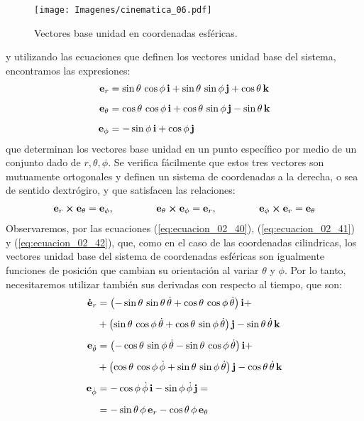 \documentclass[12pt]{article}
\begin{document}
\begin{figure}[H]
    \centering
    \texttt{[image: Imagenes/cinematica\_06.pdf]}
    \caption{Vectores base unidad en coordenadas esféricas.}
    \label{fig:figura_02_06}
\end{figure}
y utilizando las ecuaciones que definen los vectores unidad base del sistema, encontramos las expresiones:
\begin{align}
    \vb{e}_{r} &= \sin \theta \, \cos \phi \, \vb{i} + \sin \theta \, \sin \phi \, \vb{j} + \cos \theta \, \vb{k} \label{eq:ecuacion_02_40} \\[0.5em]
    \vb{e}_{\theta} &= \cos \theta \, \cos \phi \, \vb{i} + \cos \theta \, \sin \phi \, \vb{j} - \sin \theta \, \vb{k} \label{eq:ecuacion_02_41} \\[0.5em]
    \vb{e}_{\phi} &= - \sin \phi \, \vb{i} + \cos \phi \, \vb{j} \label{eq:ecuacion_02_42}
\end{align}
que determinan los vectores base unidad en un punto específico por medio de un conjunto dado de $r, \theta, \phi$. Se verifica fácilmente que estos tres vectores son mutuamente ortogonales y definen un sistema de coordenadas a la derecha, o sea de sentido dextrógiro, y que satisfacen las relaciones:
\begin{align}
    \vb{e}_{r} \cp \vb{e}_{\theta} = \vb{e}_{\phi}, \hspace{1.5cm} \vb{e}_{\theta} \cp \vb{e}_{\phi} = \vb{e}_{r}, \hspace{1.5cm} \vb{e}_{\phi} \cp \vb{e}_{r} = \vb{e}_{\theta} \label{eq:ecuacion_02_43}
\end{align}
Observaremos, por las ecuaciones (\ref{eq:ecuacion_02_40}), (\ref{eq:ecuacion_02_41}) y (\ref{eq:ecuacion_02_42}), que, como en el caso de las coordenadas cilindricas, los vectores unidad base del sistema de coordenadas esféricas son igualmente funciones de posición que cambian su orientación al variar $\theta$ y $\phi$. Por lo tanto, necesitaremos utilizar también sus derivadas con respecto al tiempo, que son: 
\begin{align}
    \vb{\dot{e}}_{r} &= \left( - \sin \theta \, \sin \theta \, \dot{\theta} + \cos \theta \, \cos \phi \, \dot{\theta} \right) \vb{i} + \nonumber \\[0.5em] 
    &+ \left( \sin \theta \, \cos \phi \, \dot{\theta} + \cos \theta \, \sin \phi \, \dot{\theta} \right) \vb{j} - \sin \theta \, \dot{\theta} \, \vb{k} \label{eq:ecuacion_02_44} \\[0.5em]
    \vb{e}_{\dot{\theta}} &= \left( - \cos \theta \, \sin \phi \, \dot{\theta} - \sin \theta \, \cos \phi \, \dot{\theta} \right) \vb{i} + \nonumber \\[0.5em]
    &+ \left( \cos \theta \, \cos \phi \, \dot{\phi} + \sin \theta \, \sin \phi \, \dot{\theta} \right) \vb{j} - \cos \theta \, \dot{\theta} \, \vb{k} \label{eq:ecuacion_02_45} \\[0.5em]
    \vb{e}_{\dot{\phi}} &= - \cos \phi \, \dot{\phi} \, \vb{i} - \sin \phi \, \dot{\phi} \, \vb{j} = \nonumber \\[0.5em]
    &= - \sin \theta \, \phi \, \vb{e}_{r} - \cos \theta \, \phi \, \vb{e}_{\theta} \label{eq:ecuacion_02_46}
\end{align}
\end{document}
